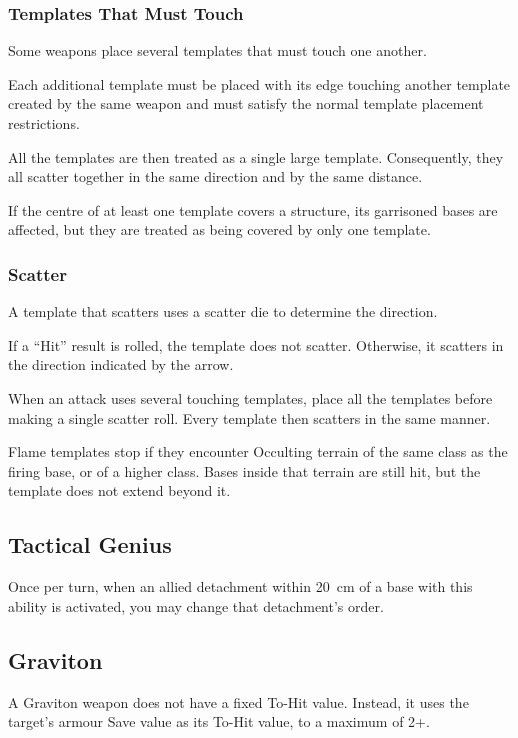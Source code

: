 \subsubsection{Templates That Must Touch}

Some weapons place several templates that must touch one another.

Each additional template must be placed with its edge touching another template created by the same weapon and must satisfy the normal template placement restrictions.

All the templates are then treated as a single large template. Consequently, they all scatter together in the same direction and by the same distance.

If the centre of at least one template covers a structure, its garrisoned bases are affected, but they are treated as being covered by only one template.

\subsubsection{Scatter}

A template that scatters uses a scatter die to determine the direction.

If a ``Hit'' result is rolled, the template does not scatter. Otherwise, it scatters in the direction indicated by the arrow.

When an attack uses several touching templates, place all the templates before making a single scatter roll. Every template then scatters in the same manner.

Flame templates stop if they encounter Occulting terrain of the same class as the firing base, or of a higher class. Bases inside that terrain are still hit, but the template does not extend beyond it.

\subsection{Tactical Genius}

Once per turn, when an allied detachment within 20~cm of a base with this ability is activated, you may change that detachment's order.

\subsection{Graviton}

A Graviton weapon does not have a fixed To-Hit value. Instead, it uses the target's armour Save value as its To-Hit value, to a maximum of 2+.

